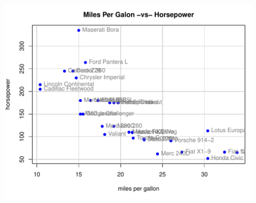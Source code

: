\documentclass[12pt]{beamer}\usepackage[]{graphicx}\usepackage[]{color}
\newenvironment{knitrout}{}{} %
\begin{document}
\begin{frame}[fragile]
\begin{knitrout}\footnotesize
{}\color{fgcolor}

{\centering \includegraphics[width=.8\linewidth,height=.7\linewidth]{figure/margins_plot-1} 

}



\end{knitrout}
\end{frame}

\end{document}
